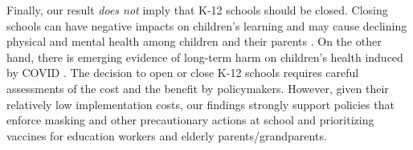 \documentclass[9pt,twocolumn,twoside,lineno]{pnas-new}
\begin{document}
Finally, our result \textit{does not} imply that K-12 schools should be closed. Closing schools can have negative impacts on children's learning \citep{Engzelle2021} and may cause declining physical and mental health among children and their parents \citep{TAKAKU2021,Fordn614,Gadermanne042871}. On the other hand,
there is emerging evidence of long-term harm on children's health induced by COVID  \citep{parcha2021}.
The decision to open or close K-12 schools requires careful assessments of the cost and the benefit by policymakers. However,  given their relatively low implementation costs,  our findings strongly support policies that enforce masking and other precautionary actions at school and prioritizing vaccines for education workers and elderly parents/grandparents.
 
\begin{table}[!htbp] \centering
 \caption{The Predictive Effects (Association) of School/College Openings  on Full-time Workplace Visits and Staying Home   in the United States: Standard Fixed Effects Estimator without Bias Correction}\vspace{-0.3cm}
 \label{tab:PItoB}
 \smallskip
{}
\end{table}
\end{document}
